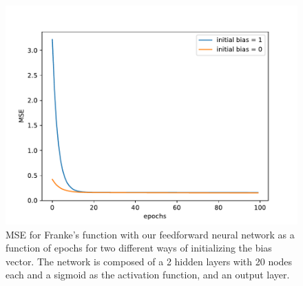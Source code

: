 \documentclass[aps,reprint,superscriptaddress,nofootinbib]{revtex4-2}
\begin{document}

\begin{figure}[htp]
    \centering
    \includegraphics[width=\linewidth]{part_c/2_init_bias_comp.pdf}
    \caption{MSE for Franke's function with our feedforward neural network as a function of epochs for two different ways of initializing the bias vector. The network is composed of a 2 hidden layers with 20 nodes each and a sigmoid as the activation function, and an output layer.}
    \label{fig:mse_init_bias}
\end{figure}
\end{document}

